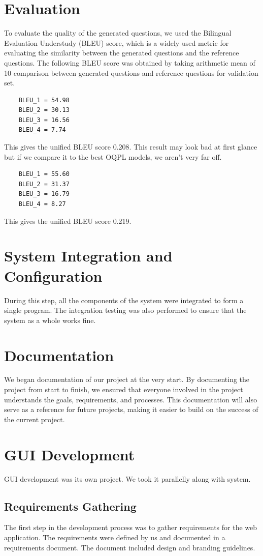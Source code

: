 \documentclass[12pt]{report}
\begin{document}
\section{Evaluation}
To evaluate the quality of the generated questions, we used the Bilingual Evaluation Understudy (BLEU) score, which is a widely used metric for evaluating the similarity between the generated questions and the reference questions. The following BLEU score was obtained by taking arithmetic mean of 10 comparison between generated questions and reference questions for validation set. 
\begin{verbatim}
    BLEU_1 = 54.98
    BLEU_2 = 30.13
    BLEU_3 = 16.56
    BLEU_4 = 7.74
\end{verbatim}
This gives the unified BLEU score 0.208.
This result may look bad at first glance but if we compare it to the best OQPL models, we aren't very far off.
\begin{verbatim}
    BLEU_1 = 55.60
    BLEU_2 = 31.37
    BLEU_3 = 16.79
    BLEU_4 = 8.27
\end{verbatim}
This gives the unified BLEU score 0.219.\cite{lopez2021simplifying}

\section{System Integration and Configuration}
During this step, all the components of the system were integrated to form a single program. The integration testing was also performed to ensure that the system as a whole works fine.

\section{Documentation}
We began documentation of our project at the very start. By documenting the project from start to finish, we ensured that everyone involved in the project understands the goals, requirements, and processes. This documentation will also serve as a reference for future projects, making it easier to build on the success of the current project.
\section{GUI Development}
GUI development was its own project. We took it parallelly along with system. 
\subsection{Requirements Gathering}
The first step in the development process was to gather requirements for the web application. The requirements were defined by us and documented in a requirements document. The document included  design and branding guidelines.
\end{document}

